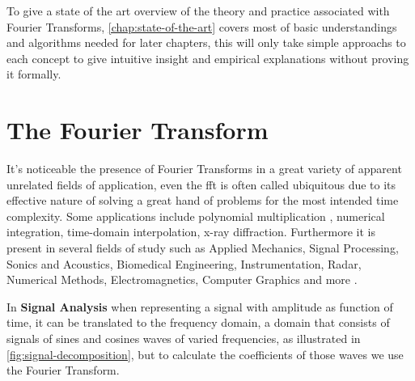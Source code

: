 \documentclass[
  oneside,
  11pt, a4paper,
  footinclude=true,
  headinclude=true,
  cleardoublepage=empty
]{scrbook}
\begin{document}
To give a state of the art overview of the theory and practice associated with Fourier Transforms, \autoref{chap:state-of-the-art} covers most of basic understandings and algorithms needed for later chapters, this will only take simple approachs to each concept to give intuitive insight and empirical explanations without proving it formally.





\chapter{The Fourier Transform} \label{chap:state-of-the-art}

It's noticeable the presence of Fourier Transforms in a great variety of apparent unrelated fields of application, even the \acrshort{fft} is often called ubiquitous due to its effective nature of solving a great hand of problems for the most intended time complexity. Some applications include polynomial multiplication \cite{jia2014polynomial}, numerical integration, time-domain interpolation, x-ray diffraction. Furthermore it is present in several fields of study such as Applied Mechanics, Signal Processing, Sonics and Acoustics, Biomedical Engineering, Instrumentation, Radar, Numerical Methods, Electromagnetics, Computer Graphics and more \cite{brigham1988fast}.

In \textbf{Signal Analysis} when representing a signal with amplitude as function of time, it can be translated to the frequency domain, a domain that consists of signals of sines and cosines waves of varied frequencies, as illustrated in \autoref{fig:signal-decomposition}, but to calculate the coefficients of those waves we use the Fourier Transform.
\end{document}
